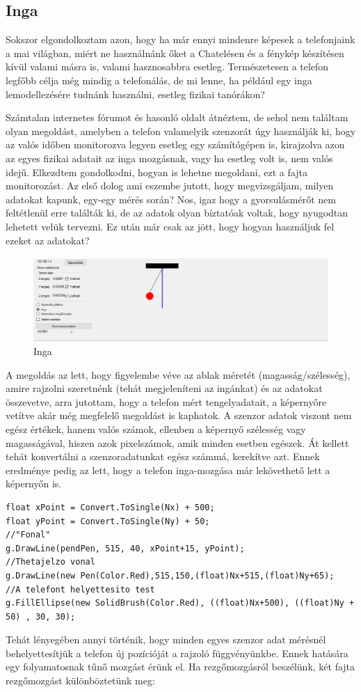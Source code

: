 \documentclass{thesis-ekf}
\theoremstyle{definition}
\theoremstyle{remark}
\begin{document}
\subsection{Inga}
Sokszor elgondolkoztam azon, hogy ha már ennyi mindenre képesek a telefonjaink a mai világban, miért ne használnánk őket a Chatelésen és a fénykép készítésen kívül valami másra is, valami hasznosabbra esetleg. Természetesen a telefon legfőbb célja még mindig a telefonálás, de mi lenne, ha például egy inga lemodellezésére tudnánk használni, esetleg fizikai tanórákon?
\par Számtalan internetes fórumot és hasonló oldalt átnéztem, de sehol nem találtam olyan megoldást, amelyben a telefon valamelyik szenzorát úgy használják ki, hogy az valós időben monitorozva legyen esetleg egy számítógépen is, kirajzolva azon az egyes fizikai adatait az inga mozgásnak, vagy ha esetleg volt is, nem valós idejű. Elkezdtem gondolkodni, hogyan is lehetne megoldani, ezt a fajta monitorozást. Az első dolog ami eszembe jutott, hogy megvizsgáljam, milyen adatokat kapunk, egy-egy mérés során? Nos, igaz hogy a gyorsulásmérőt nem feltétlenül erre találták ki, de az adatok olyan bíztatóak voltak, hogy nyugodtan lehetett velük tervezni. Ez után már csak az jött, hogy hogyan használjuk fel ezeket az adatokat?
\begin{figure}[!h]
	\centering
	\includegraphics[width=15cm]{inga}
	\caption{Inga}\label{inga}
\end{figure}
\par A megoldás az lett, hogy figyelembe véve az ablak méretét (magasság/szélesség), amire rajzolni szeretnénk (tehát megjeleníteni az ingánkat) és az adatokat összevetve, arra jutottam, hogy a telefon mért tengelyadatait, a képernyőre vetítve akár még megfelelő megoldást is kaphatok. A szenzor adatok viszont nem egész értékek, hanem valós számok, ellenben a képernyő szélesség vagy magasságával, hiszen azok pixelszámok, amik minden esetben egészek. Át kellett tehát konvertálni a szenzoradatunkat egész számmá, kerekítve azt. Ennek eredménye pedig az lett, hogy a telefon inga-mozgása már lekövethető lett a képernyőn is. 
 \begin{lstlisting}
float xPoint = Convert.ToSingle(Nx) + 500;
float yPoint = Convert.ToSingle(Ny) + 50;
//"Fonal"
g.DrawLine(pendPen, 515, 40, xPoint+15, yPoint);
//Thetajelzo vonal
g.DrawLine(new Pen(Color.Red),515,150,(float)Nx+515,(float)Ny+65);
//A telefont helyettesito test
g.FillEllipse(new SolidBrush(Color.Red), ((float)Nx+500), ((float)Ny + 50) , 30, 30);
 \end{lstlisting}
 \par Tehát lényegében annyi történik, hogy minden egyes szenzor adat mérésnél behelyettesítjük a telefon új pozícióját a rajzoló függvényünkbe. Ennek hatására egy folyamatosnak tűnő mozgást érünk el. Ha rezgőmozgásról beszélünk, két fajta rezgőmozgást különböztetünk meg:
\end{document}
